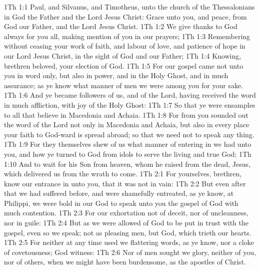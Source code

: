 \vs 1Th 1:1 Paul, and Silvanus, and Timotheus, unto the church of the Thessalonians  in God the Father and  the Lord Jesus Christ: Grace  unto you, and peace, from God our Father, and the Lord Jesus Christ.
\vs 1Th 1:2 We give thanks to God always for you all, making mention of you in our prayers;
\vs 1Th 1:3 Remembering without ceasing your work of faith, and labour of love, and patience of hope in our Lord Jesus Christ, in the sight of God and our Father;
\vs 1Th 1:4 Knowing, brethren beloved, your election of God.
\vs 1Th 1:5 For our gospel came not unto you in word only, but also in power, and in the Holy Ghost, and in much assurance; as ye know what manner of men we were among you for your sake.
\vs 1Th 1:6 And ye became followers of us, and of the Lord, having received the word in much affliction, with joy of the Holy Ghost:
\vs 1Th 1:7 So that ye were ensamples to all that believe in Macedonia and Achaia.
\vs 1Th 1:8 For from you sounded out the word of the Lord not only in Macedonia and Achaia, but also in every place your faith to God-ward is spread abroad; so that we need not to speak any thing.
\vs 1Th 1:9 For they themselves shew of us what manner of entering in we had unto you, and how ye turned to God from idols to serve the living and true God;
\vs 1Th 1:10 And to wait for his Son from heaven, whom he raised from the dead,  Jesus, which delivered us from the wrath to come.
\vs 1Th 2:1 For yourselves, brethren, know our entrance in unto you, that it was not in vain:
\vs 1Th 2:2 But even after that we had suffered before, and were shamefully entreated, as ye know, at Philippi, we were bold in our God to speak unto you the gospel of God with much contention.
\vs 1Th 2:3 For our exhortation  not of deceit, nor of uncleanness, nor in guile:
\vs 1Th 2:4 But as we were allowed of God to be put in trust with the gospel, even so we speak; not as pleasing men, but God, which trieth our hearts.
\vs 1Th 2:5 For neither at any time used we flattering words, as ye know, nor a cloke of covetousness; God  witness:
\vs 1Th 2:6 Nor of men sought we glory, neither of you, nor  of others, when we might have been burdensome, as the apostles of Christ.
